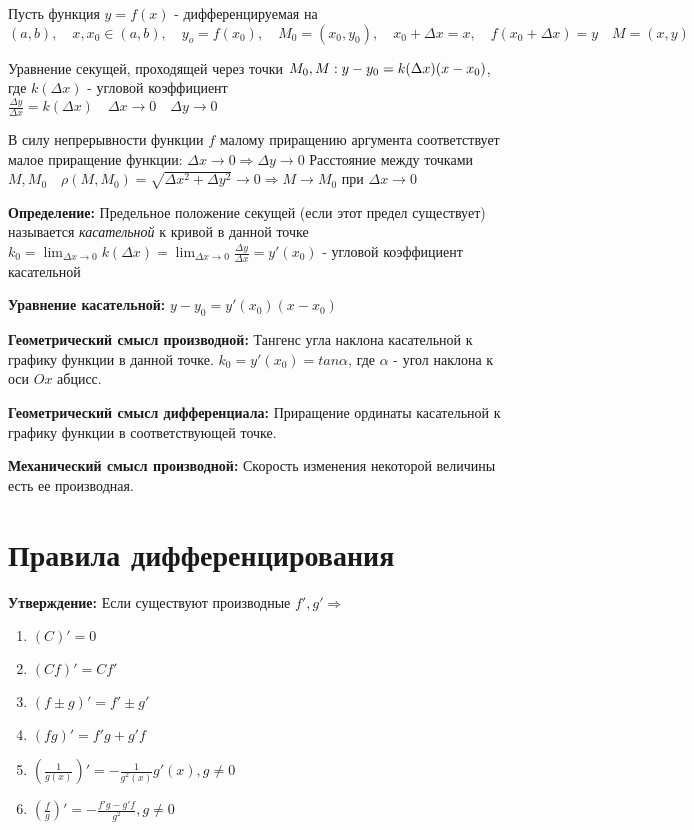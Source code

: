 \documentclass[fleqn, 12pt]{article}
\begin{document}
Пусть функция \(y = f(x)\) - дифференцируемая на
\((a, b),
\quad x, x_0 \in (a, b),
\quad y_o = f(x_0), \quad M_0 = (x_0, y_0),
\quad x_0 + \Delta x = x,
\quad f(x_0 + \Delta x) = y
\quad M = (x, y)\)

Уравнение секущей, проходящей через точки \(M_0, M: \\
y - y_0 = k(\Delta x)(x - x_0)\), где \(k(\Delta x)\) - угловой коэффициент \\
\(\frac{\Delta y}{\Delta x} = k(\Delta x)
\quad \Delta x \to 0
\quad \Delta y \to 0\)

В силу непрерывности функции \(f\) малому приращению аргумента
соответствует малое приращение функции:
\(\Delta x \to 0 \Rightarrow \Delta y \to 0\)
Расстояние между точками \(M, M_0
\quad \rho (M, M_0) = \sqrt{\Delta x^2 + \Delta y^2} \to 0 \Rightarrow M \to M_0 \)
при \(\Delta x \to 0\)

\textbf{Определение:} Предельное положение секущей (если этот предел существует)
называется \textit{касательной} к кривой в данной точке
$k_0 = \lim_{\Delta x \to 0} k(\Delta x) =
	\lim_{\Delta x \to 0} \frac {\Delta y}{\Delta x} = y'(x_0)$ -
угловой коэффициент касательной

\textbf{Уравнение касательной:} $y - y_0 = y'(x_0)(x - x_0)$

\textbf{Геометрический смысл производной:}
Тангенс угла наклона касательной к графику функции в данной точке.
$k_0 = y'(x_0) = tan \alpha$, где $\alpha$ - угол наклона к оси $Ox$ абцисс.

\textbf{Геометрический смысл дифференциала:}
Приращение ординаты касательной к графику функции
в соответствующей точке.

\textbf{Механический смысл производной:}
Скорость изменения некоторой величины есть ее производная.

\section{Правила дифференцирования}
\textbf{Утверждение:} Если существуют производные $f', g' \Rightarrow$

\begin{enumerate}
	\item $(C)' = 0 $
	\item $(C f)' = C f' $
	\item $(f \pm g)' = f' \pm g' $
	\item $(f g)' = f'g + g'f $
	\item $(\frac{1}{g(x)})' = -\frac{1}{g^2(x)}g'(x), g \ne 0 $
	\item $(\frac{f}{g})' = -\frac{f'g - g'f}{g^2}, g \ne 0 $
\end{enumerate}
\end{document}
